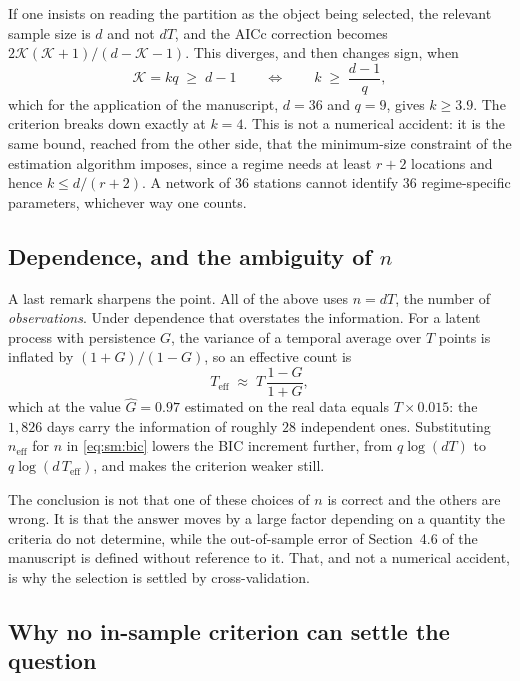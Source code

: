\documentclass[11pt]{article}
\begin{document}
If one insists on reading the partition as the object being selected, the relevant sample size is $d$ and not $dT$, and the AICc correction becomes $2\mathcal{K}(\mathcal{K}+1)/(d - \mathcal{K} - 1)$. This diverges, and then changes sign, when
\begin{equation}\label{eq:sm:bound}
  \mathcal{K} = kq \;\ge\; d - 1
  \qquad\Longleftrightarrow\qquad
  k \;\ge\; \frac{d-1}{q},
\end{equation}
which for the application of the manuscript, $d = 36$ and $q = 9$, gives $k \ge 3.9$. The criterion breaks down exactly at $k = 4$. This is not a numerical accident: it is the same bound, reached from the other side, that the minimum-size constraint of the estimation algorithm imposes, since a regime needs at least $r+2$ locations and hence $k \le d/(r+2)$. A network of $36$ stations cannot identify $36$ regime-specific parameters, whichever way one counts.

\subsection{Dependence, and the ambiguity of \texorpdfstring{$n$}{n}}

A last remark sharpens the point. All of the above uses $n = dT$, the number of \emph{observations}. Under dependence that overstates the information. For a latent process with persistence $G$, the variance of a temporal average over $T$ points is inflated by $(1+G)/(1-G)$, so an effective count is
\begin{equation}\label{eq:sm:neff}
  T_{\mathrm{eff}} \;\approx\; T\,\frac{1-G}{1+G},
\end{equation}
which at the value $\hat{G} = 0.97$ estimated on the real data equals $T \times 0.015$: the $1{,}826$ days carry the information of roughly $28$ independent ones. Substituting $n_{\mathrm{eff}}$ for $n$ in \eqref{eq:sm:bic} lowers the BIC increment further, from $q\log(dT)$ to $q\log(d\,T_{\mathrm{eff}})$, and makes the criterion weaker still.

The conclusion is not that one of these choices of $n$ is correct and the others are wrong. It is that the answer moves by a large factor depending on a quantity the criteria do not determine, while the out-of-sample error of Section~4.6 of the manuscript is defined without reference to it. That, and not a numerical accident, is why the selection is settled by cross-validation.

\subsection{Why no in-sample criterion can settle the question}
\end{document}
